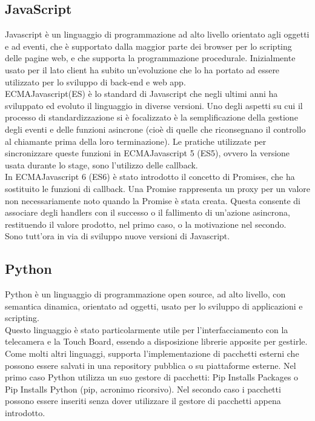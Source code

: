 \subsection{JavaScript}
Javascript \`e un linguaggio di programmazione ad alto livello orientato agli oggetti e ad eventi, che \`e supportato dalla maggior parte dei browser
per lo scripting delle pagine web, e che supporta la programmazione procedurale.
Inizialmente usato per il lato client ha subito un'evoluzione che lo ha portato ad essere utilizzato per lo sviluppo di back-end e web app.
\\[2\baselineskip]
ECMAJavascript(ES) \`e lo standard di Javascript che negli ultimi anni ha sviluppato ed evoluto il linguaggio in diverse versioni.
Uno degli aspetti su cui il processo di standardizzazione si è focalizzato \`e la semplificazione della gestione degli eventi e delle funzioni asincrone
(cio\`e di quelle che riconsegnano il controllo al chiamante prima della loro terminazione).
Le pratiche utilizzate per sincronizzare queste funzioni in ECMAJavascript 5 (ES5), ovvero la versione usata durante lo
stage, sono l'utilizzo delle callback.\\[1\baselineskip]
In ECMAJavascript 6 (ES6) \`e stato introdotto il concetto di Promises, che ha sostituito le funzioni di callback.
Una Promise rappresenta un proxy per un valore non necessariamente noto quando la Promise \`e stata creata. Questa consente di associare degli handlers
con il successo o il fallimento di un'azione asincrona, restituendo il valore prodotto, nel primo caso, o la motivazione nel secondo.\\
Sono tutt'ora in via di sviluppo nuove versioni di Javascript.

\subsection{Python}\label{cap:python}
Python \`e un linguaggio di programmazione open source, ad alto livello, con semantica dinamica, orientato ad oggetti, usato
per lo sviluppo di applicazioni e scripting.\\[1\baselineskip]
Questo linguaggio \`e stato particolarmente utile per l'interfacciamento con la telecamera e la Touch Board, essendo a disposizione librerie
apposite per gestirle.\\
Come molti altri linguaggi, supporta l'implementazione di pacchetti esterni che possono essere salvati in una repository pubblica
o su piattaforme esterne.
Nel primo caso Python utilizza un suo gestore di pacchetti: Pip Installs Packages o Pip Installs Python (pip, acronimo ricorsivo).
Nel secondo caso i pacchetti possono essere inseriti senza dover utilizzare il gestore di pacchetti appena introdotto.
\\[2\baselineskip]

